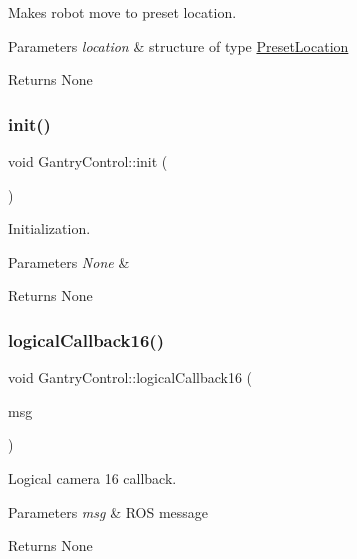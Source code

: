 Makes robot move to preset location. 


\begin{DoxyParams}{Parameters}
{\em location} & structure of type \hyperlink{structPresetLocation}{Preset\+Location} \\
\hline
\end{DoxyParams}
\begin{DoxyReturn}{Returns}
None 
\end{DoxyReturn}
\mbox{\label{classGantryControl_a71f13d325c732d931ed5ed175c5b3e7a}} 
\subsubsection{\texorpdfstring{init()}{init()}}
{\footnotesize\ttfamily void Gantry\+Control\+::init (\begin{DoxyParamCaption}{ }\end{DoxyParamCaption})}



Initialization. 


\begin{DoxyParams}{Parameters}
{\em None} & \\
\hline
\end{DoxyParams}
\begin{DoxyReturn}{Returns}
None 
\end{DoxyReturn}
\mbox{\label{classGantryControl_a9206feae49953cf691e0dec2331cc3ae}} 
\subsubsection{\texorpdfstring{logical\+Callback16()}{logicalCallback16()}}
{\footnotesize\ttfamily void Gantry\+Control\+::logical\+Callback16 (\begin{DoxyParamCaption}\item[{const nist\+\_\+gear\+::\+Logical\+Camera\+Image \&}]{msg }\end{DoxyParamCaption})}



Logical camera 16 callback. 


\begin{DoxyParams}{Parameters}
{\em msg} & R\+OS message \\
\hline
\end{DoxyParams}
\begin{DoxyReturn}{Returns}
None 
\end{DoxyReturn}
\mbox{\label{classGantryControl_a9d745504ec1dbcc8549f5a604f34bbcc}} 
